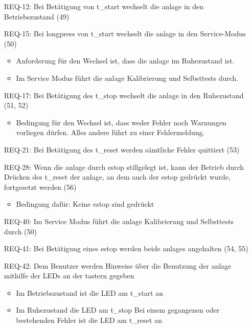 \begin{itemize}
    \item[REQ-12:] Bei Betätigung von \gls{t_start} wechselt die \gls{anlage} in den Betriebszustand (49)
    \item[REQ-15:] Bei \gls{longpress} von \gls{t_start} wechselt die \gls{anlage} in den Service-Modus (50)
    \begin{itemize}
        \item Anforderung für den Wechsel ist, dass die \gls{anlage} im Ruhezustand ist.
        \item Im Service Modus führt die \gls{anlage} Kalibrierung und Selbsttests durch. %
    \end{itemize}
    \item[REQ-17:] Bei Betätigung des \gls{t_stop} wechselt die \gls{anlage} in den Ruhezustand (51, 52)
    \begin{itemize}
        \item Bedingung für den Wechsel ist, dass weder Fehler noch Warnungen vorliegen dürfen. %
        Alles andere führt zu einer Fehlermeldung.
    \end{itemize}
    \item[REQ-21:] Bei Betätigung des \gls{t_reset} werden sämtliche Fehler quittiert (53) %
    \item[REQ-28:] Wenn die \gls{anlage} durch \gls{estop} stillgelegt ist, kann der Betrieb durch Drücken des
    \gls{t_reset} der \gls{anlage}, an dem auch der \gls{estop} gedrückt wurde, fortgesetzt werden (56) %
    \begin{itemize}
        \item Bedingung dafür: Keine \gls{estop} sind gedrückt
    \end{itemize}
    \item[REQ-40:] Im Service Modus führt die \gls{anlage} Kalibrierung und Selbsttests durch (50) %
    \item[REQ-41:] Bei Betätigung eines \gls{estop} werden beide \glspl{anlage} angehalten (54, 55)
    \item[REQ-42:] Dem Benutzer werden Hinweise über die Benutzung der \gls{anlage} mithilfe der LEDs an der \gls{taster}n gegeben
    \begin{itemize}
        \item Im Betriebszustand ist die LED am \gls{t_start} an
        \item Im Ruhezustand die LED am \gls{t_stop}
        \tiem Bei einem gegangenen oder bestehenden Fehler ist die LED am \gls{t_reset} an
    \end{itemize}
\end{itemize}

